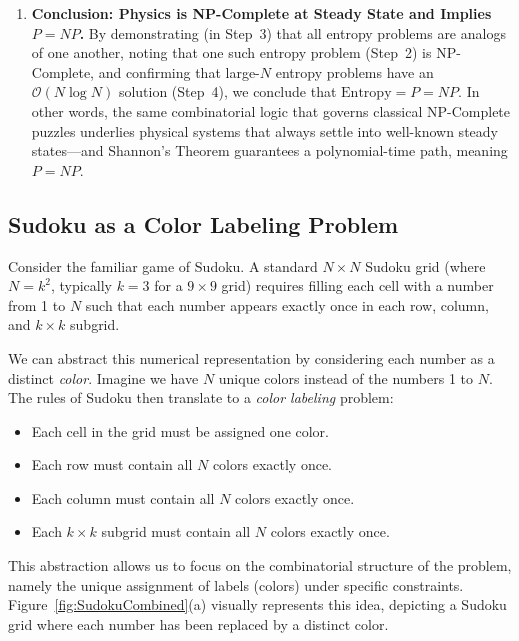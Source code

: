 \documentclass{report}
\begin{document}
\begin{enumerate}
    \item 
        \textbf{Conclusion: Physics is NP-Complete at Steady State and Implies \(P = NP\).} 
        By demonstrating (in Step~3) that all entropy problems are analogs of one another, noting 
        that one such entropy problem (Step~2) is NP-Complete, and confirming that large-\(N\) 
        entropy problems have an \(\mathcal{O}(N \log N)\) solution (Step~4), we conclude that 
        \(\mathrm{Entropy} = P = NP\). In other words, the same combinatorial logic that governs 
        classical NP-Complete puzzles underlies physical systems that always settle into well-known 
        steady states---and Shannon’s Theorem guarantees a polynomial-time path, meaning 
        \(P=NP\).
\end{enumerate}

\subsection*{Sudoku as a Color Labeling Problem}

Consider the familiar game of Sudoku. A standard \(N \times N\) Sudoku grid (where \(N = k^2\), typically \(k=3\) for a \(9 \times 9\) grid) requires filling each cell with a number from 1 to \(N\) such that each number appears exactly once in each row, column, and \(k \times k\) subgrid.

We can abstract this numerical representation by considering each number as a distinct \emph{color}. Imagine we have \(N\) unique colors instead of the numbers 1 to \(N\). The rules of Sudoku then translate to a \emph{color labeling} problem:

\begin{itemize}
    \item Each cell in the grid must be assigned one color.
    \item Each row must contain all \(N\) colors exactly once.
    \item Each column must contain all \(N\) colors exactly once.
    \item Each \(k \times k\) subgrid must contain all \(N\) colors exactly once.
\end{itemize}

This abstraction allows us to focus on the combinatorial structure of the problem, namely the unique assignment of labels (colors) under specific constraints. Figure~\ref{fig:SudokuCombined}(a) visually represents this idea, depicting a Sudoku grid where each number has been replaced by a distinct color.
\end{document}
